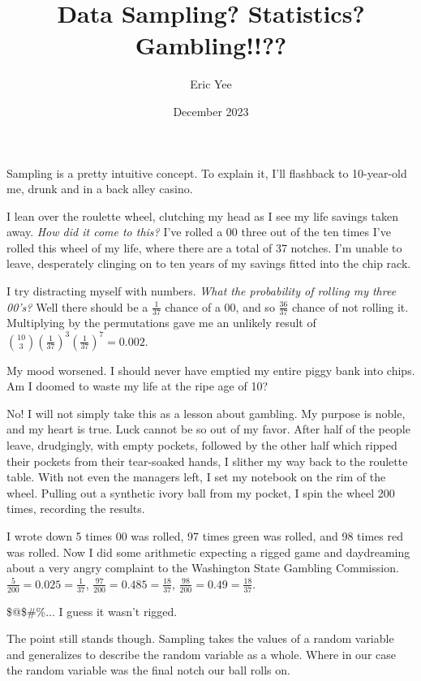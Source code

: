 \documentclass{article}
\title{Data Sampling? Statistics? Gambling!!??}
\author{Eric Yee}
\date{December 2023}
\begin{document}
\maketitle

Sampling is a pretty intuitive concept. To explain it, I'll flashback to 10-year-old me, drunk and in a back alley casino.

I lean over the roulette wheel, clutching my head as I see my life savings taken away. \emph{How did it come to this?} I've rolled a 00 three out of the ten times I've rolled this wheel of my life, where there are a total of 37 notches. I'm unable to leave, desperately clinging on to ten years of my savings fitted into the chip rack. 

I try distracting myself with numbers. \emph{What the probability of rolling my three 00's?} Well there should be a $\frac{1}{37}$ chance of a $00$, and so $\frac{36}{37}$ chance of not rolling it. Multiplying by the permutations gave me an unlikely result of $\binom{10}{3}\left(\frac{1}{37}\right)^3\left(\frac{1}{37}\right)^7=0.002$. 

My mood worsened. I should never have emptied my entire piggy bank into chips. Am I doomed to waste my life at the ripe age of 10?

No! I will not simply take this as a lesson about gambling. My purpose is noble, and my heart is true. Luck cannot be so out of my favor. After half of the people leave, drudgingly, with empty pockets, followed by the other half which ripped their pockets from their tear-soaked hands, I slither my way back to the roulette table. With not even the managers left, I set my notebook on the rim of the wheel. Pulling out a synthetic ivory ball from my pocket, I spin the wheel 200 times, recording the results. 

I wrote down 5 times 00 was rolled, 97 times green was rolled, and 98 times red was rolled. Now I did some arithmetic expecting a rigged game and daydreaming about a very angry complaint to the Washington State Gambling Commission. $\frac{5}{200} = 0.025=\frac{1}{37}$, $\frac{97}{200} = 0.485=\frac{18}{37}$, $\frac{98}{200} = 0.49=\frac{18}{37}$.

\$@\$\#\%... I guess it wasn't rigged.

The point still stands though. Sampling takes the values of a random variable and generalizes to describe the random variable as a whole. Where in our case the random variable was the final notch our ball rolls on.
\end{document}

